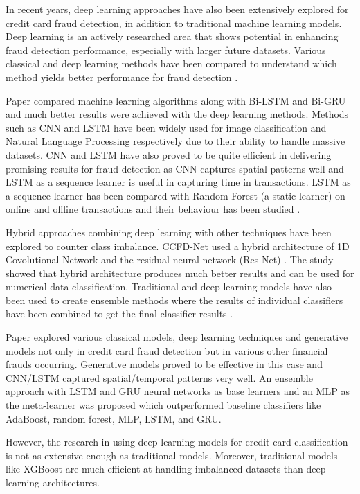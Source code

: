 \documentclass[pdflatex,sn-mathphys-num]{sn-jnl}%
\begin{document}
In recent years, deep learning approaches have also been extensively explored for credit card fraud detection, in addition to traditional machine learning models. Deep learning is an actively researched area that shows potential in enhancing fraud detection performance, especially with larger future datasets.
Various classical and deep learning methods have been compared to understand which method yields better performance for fraud detection \cite{alarfaj2022credit}.

Paper \cite{hassan2020} compared machine learning algorithms along with Bi-LSTM and Bi-GRU and much better results were achieved with the deep learning methods. Methods such as CNN and LSTM have been widely used for image classification and Natural Language Processing respectively due to their ability to handle massive datasets. CNN and LSTM have also proved to be quite efficient in delivering promising results for fraud detection as CNN captures spatial patterns well and LSTM as a sequence learner is useful in capturing time in transactions\cite{nguyen2020}. LSTM as a sequence learner has been compared with Random Forest (a static learner) on online and offline transactions and their behaviour has been studied \cite{jurgovsky2018}.

Hybrid approaches combining deep learning with other techniques have been explored to counter class imbalance. CCFD-Net used a hybrid architecture of 1D Covolutional Network and the residual neural network (Res-Net) \cite{liu2021}. The study showed that hybrid architecture produces much better results and can be used for numerical data classification. Traditional and deep learning models have also been used to create ensemble methods where the results of individual classifiers have been combined to get the final classifier results \cite{sahithi2022} \cite{sohony2018}.

Paper \cite{hilal2022} explored various classical models, deep learning techniques and generative models not only in credit card fraud detection but in various other financial frauds occurring. Generative models proved to be effective in this case and CNN/LSTM captured spatial/temporal patterns very well. An ensemble approach with LSTM and GRU neural networks as base learners and an MLP as the meta-learner was proposed \cite{mienye2023} which outperformed baseline classifiers like AdaBoost, random forest, MLP, LSTM, and GRU.

However, the research in using deep learning models for credit card classification is not as extensive enough as traditional models. Moreover, traditional models like XGBoost are much efficient at handling imbalanced datasets than deep learning architectures.
\end{document}
